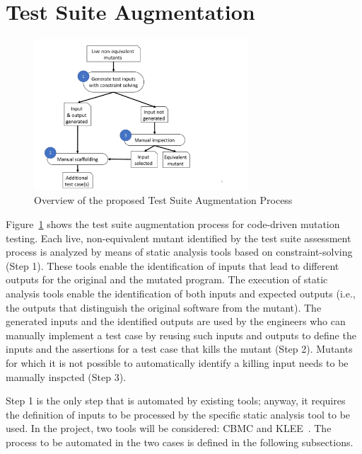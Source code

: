 \clearpage
\section{Test Suite Augmentation}
\label{sec:testGeneration}

\begin{figure}[tb]
\begin{center}
\includegraphics[width=8cm]{images/codeDrivenTestSuiteAugmentationProcess}
\caption{Overview of the proposed Test Suite Augmentation Process}
\label{fig:codeDrivenTestSuiteAugmentationProcess}
\end{center}
\end{figure}

Figure~\ref{fig:codeDrivenTestSuiteAugmentationProcess} shows the test suite augmentation process for code-driven mutation testing.
Each live, non-equivalent mutant identified by the test suite assessment process is analyzed by means of static analysis tools based on constraint-solving (Step 1). These tools enable the identification of inputs that lead to different outputs for the original and the mutated program.
The execution of static analysis tools enable the identification of both inputs and expected outputs (i.e., the outputs that distinguish the original software from the mutant). The generated inputs and the identified outputs are used by the engineers who can manually implement a test case by reusing such inputs and outputs to define the inputs and the assertions for a test case that kills the mutant (Step 2). Mutants for which it is not possible to automatically identify a killing input needs to be manually inspcted (Step 3).


Step 1 is the only step that is automated by existing tools; anyway, it requires the definition of inputs to be processed by the specific static analysis tool to be used. In the project, two tools will be considered: CBMC and KLEE~\cite{cadar2008klee}. The process to be automated in the two cases is defined in the following subsections.

